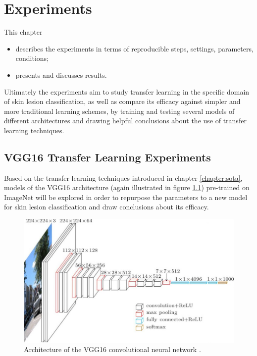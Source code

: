 \chapter{Experiments}
\label{chapter:experiments}

This chapter

\begin{itemize}
    \item describes the experiments in terms of reproducible steps, settings, parameters, conditions;
    \item presents and discusses results.
\end{itemize}

Ultimately the experiments aim to study transfer learning in the specific domain of skin lesion classification, as well as compare its efficacy against simpler and more traditional learning schemes, by training and testing several models of different architectures and drawing helpful conclusions about the use of transfer learning techniques.

\section{VGG16 Transfer Learning Experiments}

Based on the transfer learning techniques introduced in chapter \ref{chapter:sota}, models of the VGG16 architecture (again illustrated in figure \ref{fig:vgg16_reillustration}) pre-trained on ImageNet will be explored in order to repurpose the parameters to a new model for skin lesion classification and draw conclusions about its efficacy.

\begin{figure}[ht]
    \centering
    \includegraphics[width=1.0\textwidth]{figs/vgg16.jpg}
    \caption{Architecture of the VGG16 convolutional neural network \cite{vgg16}.}
    \label{fig:vgg16_reillustration}
\end{figure}


